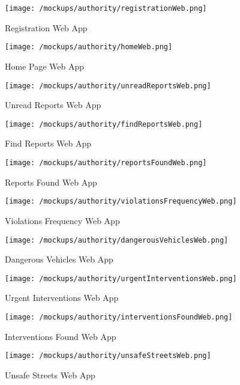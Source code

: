 	\begin{figure}[h]
		\centering
		\texttt{[image: /mockups/authority/registrationWeb.png]}
		\caption{Registration Web App}
	\end{figure}

	\begin{figure}[h]
		\centering
		\texttt{[image: /mockups/authority/homeWeb.png]}
		\caption{Home Page Web App}
	\end{figure}
 
 	\begin{figure}[h]
 		\centering
 		\texttt{[image: /mockups/authority/unreadReportsWeb.png]}
 		\caption{Unread Reports Web App}
 	\end{figure}
 
 	\begin{figure}[h]
 		\centering
 		\texttt{[image: /mockups/authority/findReportsWeb.png]}
 		\caption{Find Reports Web App}
 	\end{figure}
 
 	\begin{figure}[h]
 		\centering
 		\texttt{[image: /mockups/authority/reportsFoundWeb.png]}
 		\caption{Reports Found Web App}
 	\end{figure}
 
 	\begin{figure}[h]
 		\centering
 		\texttt{[image: /mockups/authority/violationsFrequencyWeb.png]}
 		\caption{Violations Frequency Web App}
 	\end{figure}
 
 	\begin{figure}[h]
 		\centering
 		\texttt{[image: /mockups/authority/dangerousVehiclesWeb.png]}
 		\caption{Dangerous Vehicles Web App}
 	\end{figure}
 
 	\begin{figure}[h]
 		\centering
 		\texttt{[image: /mockups/authority/urgentInterventionsWeb.png]}
 		\caption{Urgent Interventions Web App}
 	\end{figure}
 
	\begin{figure}[h]
		\centering
		\texttt{[image: /mockups/authority/interventionsFoundWeb.png]}
		\caption{Interventions Found Web App}
	\end{figure} 

	\begin{figure}[h]
		\centering
		\texttt{[image: /mockups/authority/unsafeStreetsWeb.png]}
		\caption{Unsafe Streets Web App}
	\end{figure}
 
